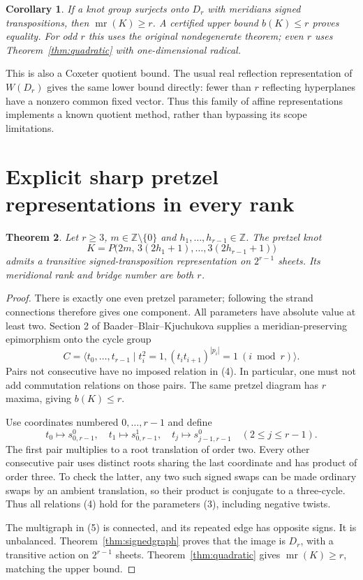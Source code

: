 \documentclass[11pt]{article}
\newtheorem{theorem}{Theorem}
\newtheorem{corollary}[theorem]{Corollary}
\newcommand{\mr}{\operatorname{mr}}
\begin{document}
\begin{corollary}
If a knot group surjects onto $D_r$ with meridians signed transpositions,
then $\mr(K)\ge r$. A certified upper bound $b(K)\le r$ proves equality.
For odd $r$ this uses the original nondegenerate theorem; even $r$ uses
Theorem~\ref{thm:quadratic} with one-dimensional radical.
\end{corollary}

This is also a Coxeter quotient bound. The usual real reflection
representation of $W(D_r)$ gives the same lower bound directly: fewer
than $r$ reflecting hyperplanes have a nonzero common fixed vector.
Thus this family of affine representations implements a known quotient
method, rather than bypassing its scope limitations.

\section{Explicit sharp pretzel representations in every rank}

\begin{theorem}\label{thm:pretzel}
Let $r\ge3$, $m\in\mathbb Z\setminus\{0\}$ and
$h_1,\ldots,h_{r-1}\in\mathbb Z$. The pretzel knot
\[
 K=P\bigl(2m,\,3(2h_1+1),\ldots,3(2h_{r-1}+1)\bigr)    \tag{3}
\]
admits a transitive signed-transposition representation on $2^{r-1}$
sheets. Its meridional rank and bridge number are both $r$.
\end{theorem}
\begin{proof}
There is exactly one even pretzel parameter; following the strand
connections therefore gives one component. All parameters have absolute
value at least two. Section 2 of Baader--Blair--Kjuchukova
\cite{bbk} supplies a meridian-preserving epimorphism onto the cycle group
\[
 C=\langle t_0,\ldots,t_{r-1}\mid t_i^2=1,
       (t_it_{i+1})^{|p_i|}=1\ (i\bmod r)\rangle.       \tag{4}
\]
Pairs not consecutive have no imposed relation in (4).
In particular, one must not add commutation relations on those pairs.
The same pretzel diagram has $r$ maxima, giving $b(K)\le r$.

Use coordinates numbered $0,\ldots,r-1$ and define
\[
 t_0\longmapsto s_{0,r-1}^0,\quad
 t_1\longmapsto s_{0,r-1}^1,\quad
 t_j\longmapsto s_{j-1,r-1}^0\quad(2\le j\le r-1).
                                                               \tag{5}
\]
The first pair multiplies to a root translation of order two. Every other
consecutive pair uses distinct roots sharing the last coordinate and
has product of order three. To check the latter, any two such signed
swaps can be made ordinary swaps by an ambient translation, so their
product is conjugate to a three-cycle. Thus all relations (4) hold for
the parameters (3), including negative twists.

The multigraph in (5) is connected, and its repeated edge has opposite
signs. It is unbalanced. Theorem~\ref{thm:signedgraph} proves that the
image is $D_r$, with a transitive action on $2^{r-1}$ sheets.
Theorem~\ref{thm:quadratic} gives $\mr(K)\ge r$, matching the upper bound.
\end{proof}
\end{document}
